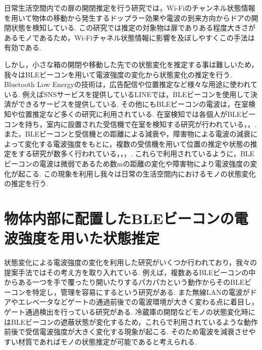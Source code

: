 \documentclass[Japanese]{dicomopapers}
\begin{document}
日常生活空間内での扉の開閉推定を行う研究\cite{WifiChannel}では，Wi-Fiのチャンネル状態情報を用いて物体の移動から発生するドップラー効果や電波の到来方向からドアの開閉状態を検知している.
この研究では推定の対象物は扉でありある程度大きさがあるモノであるため，Wi-Fiチャネル状態情報に影響を及ぼしやすくこの手法は有効である.

しかし，小さな箱の開閉や移動した先での状態変化を推定する事は難しいため，我々はBLEビーコンを用いて電波強度の変化から状態変化の推定を行う.
Bluetooth Low Energyの技術は，広告配信や位置推定など様々な用途に使われている.
例えばSNSサービスを提供しているLINEでは，BLEビーコンを使用して決済ができるサービスを提供している\cite{bleUse}.
その他にもBLEビーコンの電波は，在室検知や位置推定など多くの研究に利用されている.
在室検知では各個人がBLEビーコンを持ち，室内に設置された受信機で在室を検知する研究が行われている\cite{en-AreaUsed}，\cite{Finding_by_Counting}，\cite{dakoku_system}.
また，BLEビーコンと受信機との距離による減衰や，障害物による電波の減衰によって変化する電波強度をもとに，複数の受信機を用いて位置の推定や状態の推定をする研究が数多く行われている\cite{IoMT}，\cite{tandem}，\cite{blespot}，\cite{en-door}.%
これらで利用されているように，BLEビーコンの電波は微弱であるため数mの距離の変化や障害物により電波強度の変化が起こる.
この現象を利用し我々は日常の生活空間内におけるモノの状態変化の推定を行う.










\section{物体内部に配置したBLEビーコンの電波強度を用いた状態推定}
状態変化による電波強度の変化を利用した研究がいくつか行われており，我々の提案手法ではその考え方を取り入れている.
例えば，複数あるBLEビーコンの中からある一つを手で覆ったり開いたりするパカパカという動作からそのBLEビーコンを特定し，管理を容易にするという研究がある\cite{BLEpkpk}.
また無線LANの電波がドアやエレベータなどゲートの通過前後での電波環境が大きく変わる点に着目し，ゲート通過検出を行っている研究がある\cite{BLEpkpk}.
冷蔵庫の開閉などモノの状態変化時にはBLEビーコンの遮蔽状態が変化するため，これらで利用されているような動作前後で受信電波強度が大きく変化する現象が起こる.
そのため電波を減衰させやすい材質であればモノの状態推定が可能であると考えられる.
\end{document}
